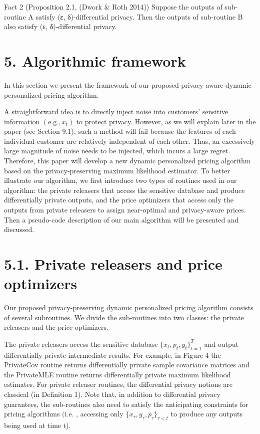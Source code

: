 Fact 2 (Proposition 2.1, (Dwork \& Roth 2014)) Suppose the outputs of sub-routine A satisfy (ε, δ)-differential privacy. Then the outputs of sub-routine B also satisfy (ε, δ)-differential privacy.

\section{5. Algorithmic framework}\label{algorithmic-framework}

In this section we present the framework of our proposed privacy-aware dynamic personalized pricing algorithm.

A straightforward idea is to directly inject noise into customers' sensitive information \(( \mathrm { e . g . } , x _ { t } )\) to protect privacy. However, as we will explain later in the paper (see Section 9.1), such a method will fail because the features of each individual customer are relatively independent of each other. Thus, an excessively large magnitude of noise needs to be injected, which incurs a large regret. Therefore, this paper will develop a new dynamic personalized pricing algorithm based on the privacy-preserving maximum likelihood estimator. To better illustrate our algorithm, we first introduce two types of routines used in our algorithm: the private releasers that access the sensitive database and produce differentially private outputs, and the price optimizers that access only the outputs from private releasers to assign near-optimal and privacy-aware prices. Then a pseudo-code description of our main algorithm will be presented and discussed.

\section{5.1. Private releasers and price optimizers}\label{private-releasers-and-price-optimizers}

Our proposed privacy-preserving dynamic personalized pricing algorithm consists of several subroutines. We divide the sub-routines into two classes: the private releasers and the price optimizers.

The private releasers access the sensitive database \(\{ x _ { t } , p _ { t } , y _ { t } \} _ { t = 1 } ^ { T }\) and output differentially private intermediate results. For example, in Figure 4 the PrivateCov routine returns differentially private sample covariance matrices and the PrivateMLE routine returns differentially private maximum likelihood estimates. For private releaser routines, the differential privacy notions are classical (in Definition 1). Note that, in addition to differential privacy guarantees, the sub-routines also need to satisfy the anticipating constraints for pricing algorithms \(( \mathrm { i . e . }\) , accessing only \(\{ x _ { \tau } , y _ { \tau } , p _ { \tau } \} _ { \tau < t }\) to produce any outputs being used at time t).

